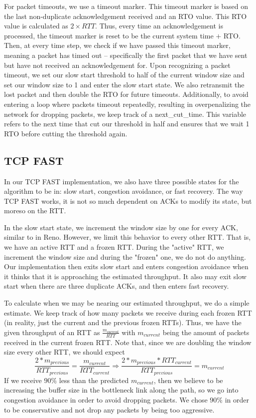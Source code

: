 \documentclass{article}
\begin{document}
For packet timeouts, we use a timeout marker. This timeout marker is based on the last non-duplicate acknowledgement received and an RTO value. This RTO value is calculated as $2 \times RTT$. Thus, every time an acknowledgement is processed, the timeout marker is reset to be the current system time $+$ RTO. Then, at every time step, we check if we have passed this timeout marker, meaning a packet has timed out -- specifically the first packet that we have sent but have not received an acknowledgement for. Upon recognizing a packet timeout, we set our slow start threshold to half of the current window size and set our window size to 1 and enter the slow start state. We also retransmit the lost packet and then double the RTO for future timeouts. Additionally, to avoid entering a loop where packets timeout repeatedly, resulting in overpenalizing the network for dropping packets, we keep track of a next\_cut\_time. This variable refers to the next time that cut our threshold in half and ensures that we wait 1 RTO before cutting the threshold again. 

\subsection{TCP FAST}

In our TCP FAST implementation, we also have three possible states for the algorithm to be in: slow start, congestion avoidance, or fast recovery. The way TCP FAST works, it is not so much dependent on ACKs to modify its state, but moreso on the RTT.

In the slow start state, we increment the window size by one for every ACK, similar to in Reno. However, we limit this behavior to every other RTT. That is, we have an active RTT and a frozen RTT. During the "active" RTT, we increment the window size and during the "frozen" one, we do not do anything. Our implementation then exits slow start and enters congestion avoidance when it thinks that it is approaching the estimated throughput. It also may exit slow start when there are three duplicate ACKs, and then enters fast recovery.

To calculate when we may be nearing our estimated throughput, we do a simple estimate. We keep track of how many packets we receive during each frozen RTT (in reality, just the current and the previous frozen RTTs). Thus, we have the given throughput of an RTT as $\frac{m_{current}}{RTT}$ with $m_{current}$ being the amount of packets received in the current frozen RTT. Note that, since we are doubling the window size every other RTT, we should expect $$\frac{2 * m_{previous}}{RTT_{previous}} = \frac{m_{current}}{RTT_{current}} \Rightarrow \frac{2 * m_{previous} * RTT_{current}}{RTT_{previous}} = m_{current}$$
If we receive $90\%$ less than the predicted $m_{current}$, then we believe to be increasing the buffer size in the bottleneck link along the path, so we go into congestion avoidance in order to avoid dropping packets. We chose $90\%$ in order to be conservative and not drop any packets by being too aggressive.
\end{document}
